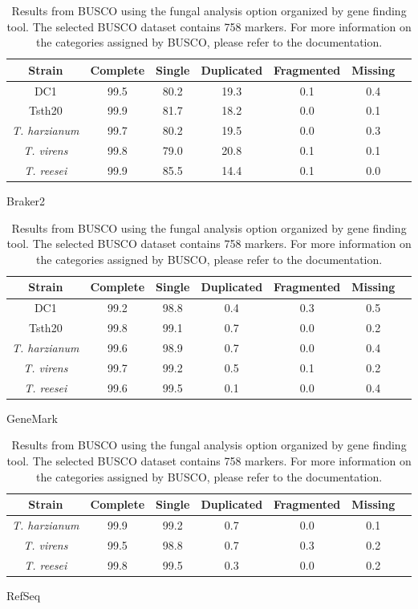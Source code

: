 \begin{table}
  \begin{center}
    \begin{subtable}{\textwidth}
      \centering
      \begin{tabular}{|c|c|c|c|c|c|c|}
        \hline
        Strain & Complete & Single & Duplicated & Fragmented & Missing \\ \hline
        DC1 & 99.5 & 80.2 & 19.3 & 0.1 & 0.4 \\ \hline
        Tsth20 & 99.9 & 81.7 & 18.2 & 0.0 & 0.1 \\ \hline
        \textit{T. harzianum} & 99.7 & 80.2 & 19.5 & 0.0 & 0.3 \\ \hline
        \textit{T. virens} & 99.8 & 79.0 & 20.8 & 0.1 & 0.1 \\ \hline
        \textit{T. reesei} & 99.9 & 85.5 & 14.4 & 0.1 & 0.0 \\ \hline
      \end{tabular}
      \caption{Braker2}
    \end{subtable}
    \begin{subtable}{\textwidth}
      \centering
      \begin{tabular}{|c|c|c|c|c|c|c|}
        \hline
        Strain & Complete & Single & Duplicated & Fragmented & Missing \\ \hline
        DC1 & 99.2 & 98.8 & 0.4 & 0.3 & 0.5 \\ \hline
        Tsth20 & 99.8 & 99.1 & 0.7 & 0.0 & 0.2 \\ \hline
        \textit{T. harzianum} & 99.6 & 98.9 & 0.7 & 0.0 & 0.4 \\ \hline
        \textit{T. virens} & 99.7 & 99.2 & 0.5 & 0.1 & 0.2 \\ \hline
        \textit{T. reesei} & 99.6 & 99.5 & 0.1 & 0.0 & 0.4 \\ \hline
      \end{tabular}
      \caption{GeneMark}
    \end{subtable}
    \begin{subtable}{\textwidth}
      \centering
      \begin{tabular}{|c|c|c|c|c|c|c|}
        \hline
        Strain & Complete & Single & Duplicated & Fragmented & Missing \\ \hline
        \textit{T. harzianum} & 99.9 & 99.2 & 0.7 & 0.0 & 0.1 \\ \hline
        \textit{T. virens} & 99.5 & 98.8 & 0.7 & 0.3 & 0.2 \\ \hline
        \textit{T. reesei} & 99.8 & 99.5 & 0.3 & 0.0 & 0.2 \\ \hline
      \end{tabular}
      \caption{RefSeq}
    \end{subtable}
  \end{center}
  \caption{Results from BUSCO using the fungal analysis option
    organized by gene finding tool. The selected BUSCO dataset
    contains 758 markers. For more information on the categories
    assigned by BUSCO, please refer to the documentation.}
  \label{table:busco}
\end{table}

